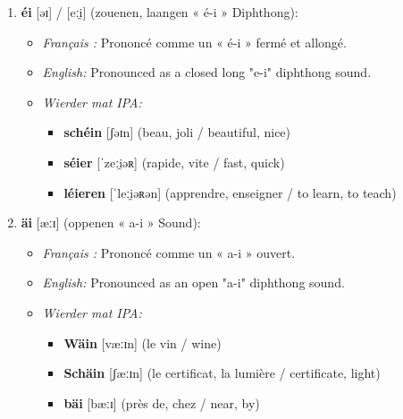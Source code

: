 \begin{enumerate}
    \item \textbf{éi} [əɪ] / [eːi̯] (zouenen, laangen « é-i » Diphthong):
    \begin{itemize}
        \item \textit{Français :} Prononcé comme un « é-i » fermé et allongé.
        \item \textit{English:} Pronounced as a closed long "e-i" diphthong sound.
        \item \textit{Wierder mat IPA:}
        \begin{itemize}
            \item \textbf{schéin} [ʃəɪn] (beau, joli / beautiful, nice)
            \item \textbf{séier} [ˈzeːi̯əʀ] (rapide, vite / fast, quick)
            \item \textbf{léieren} [ˈleːi̯əʀən] (apprendre, enseigner / to learn, to teach)
        \end{itemize}
    \end{itemize}

    \vspace{0.6em}

    \item \textbf{äi} [æːɪ] (oppenen « a-i » Sound):
    \begin{itemize}
        \item \textit{Français :} Prononcé comme un « a-i » ouvert.
        \item \textit{English:} Pronounced as an open "a-i" diphthong sound.
        \item \textit{Wierder mat IPA:}
        \begin{itemize}
            \item \textbf{Wäin} [væːɪn] (le vin / wine)
            \item \textbf{Schäin} [ʃæːɪn] (le certificat, la lumière / certificate, light)
            \item \textbf{bäi} [bæːɪ] (près de, chez / near, by)
        \end{itemize}
    \end{itemize}

    \vspace{0.6em}


\end{enumerate}
